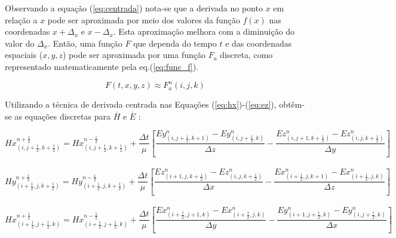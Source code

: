 	Observando a equação (\ref{eq:centrada}) nota-se que a derivada no ponto $x$ em relação a $x$ pode ser aproximada por meio dos valores da função $f(x)$ nas coordenadas $x+\Delta_{x}$ e $x-\Delta_{x}$. Esta aproximação melhora com a diminuição do valor do $\Delta_{x}$. Então, uma função $F$ que dependa do tempo $t$ e das coordenadas espaciais ($x,y,z$) pode ser aproximada por uma função $F_a$ discreta, como representado matematicamente pela eq.(\ref{eq:func_f}).

\begin{equation}\label{eq:func_f}
	F(t,x,y,z) \approx F_{a}^{n}(i,j,k)
\end{equation}

	Utilizando a técnica de derivada centrada nas Equações (\ref{eq:hx})-(\ref{eq:ez}), obtêm-se as equações discretas para $\overline{H}$ e $\overline{E}$ :

\begin{equation}
	Hx_{(i,j+\frac{1}{2}, k+\frac{1}{2})}^{n+\frac{1}{2}} =
    Hx_{(i,j+\frac{1}{2}, k+\frac{1}{2})}^{n-\frac{1}{2}} +
    \frac{\Delta{t}}{\mu} \left [ \frac{Ey^{n}_{(i,j+\frac{1}{2}, k+1)} - Ey^{n}_{(i,j+\frac{1}{2}, k)}}{\Delta{z}}-
    \frac{Ez^{n}_{(i,j+1, k+\frac{1}{2})} - Ez^{n}_{(i,j, k+\frac{1}{2})}}{\Delta{y}} \right ]
\end{equation}\\
\begin{equation}
	Hy_{(i+\frac{1}{2},j, k+\frac{1}{2})}^{n+\frac{1}{2}} =
    Hy_{(i+\frac{1}{2}, j, k+\frac{1}{2})}^{n-\frac{1}{2}} +
    \frac{\Delta{t}}{\mu} \left [ \frac{Ez^{n}_{(i+1,j, k+\frac{1}{2})} - Ez^{n}_{(i,j, k+\frac{1}{2})}}{\Delta{x}}-
    \frac{Ex^{n}_{(i+\frac{1}{2},j, k+1)} - Ex^{n}_{(i+\frac{1}{2},j, k)}}{\Delta{z}} \right ]
\end{equation}\\
\begin{equation}
	Hx_{(i+\frac{1}{2},j+\frac{1}{2}, k)}^{n+\frac{1}{2}} =
    Hx_{(i+\frac{1}{2},j+\frac{1}{2}, k)}^{n-\frac{1}{2}} +
    \frac{\Delta{t}}{\mu} \left [ \frac{Ex^{n}_{(i+\frac{1}{2},j+1, k)} - Ex^{n}_{(i+\frac{1}{2},j, k)}}{\Delta{y}}-
    \frac{Ey^{n}_{(i+1,j+\frac{1}{2}, k)} - Ey^{n}_{(i,j+\frac{1}{2}, k)}}{\Delta{x}} \right ]
\end{equation}


